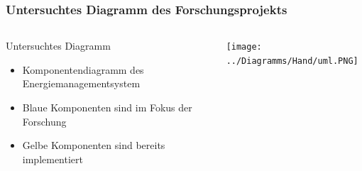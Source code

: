\documentclass[xcolor=dvipsnames]{beamer}
\begin{document}
\begin{frame}
\begin{thebibliography}{00}
		\end{thebibliography}
	\end{frame}
	
	
	
	
	
	\begin{frame}
		\frametitle{Untersuchtes Diagramm des Forschungsprojekts}
		\begin{columns}
			
			
			\begin{column}{0.35\textwidth}
				\begin{block}{Untersuchtes Diagramm}
					\begin{itemize}
						\item Komponentendiagramm des Energiemanagementsystem
						\item Blaue Komponenten sind im Fokus der Forschung
						\item Gelbe Komponenten sind bereits implementiert
					\end{itemize}
					
				\end{block}
			\end{column}
	
			\begin{column}{0.7\textwidth}
				\begin{minipage}{\textwidth}
					\texttt{[image: ../Diagramms/Hand/uml.PNG]}
				\end{minipage}
			\end{column}
			
				\end{columns}
	\end{frame}
	
	
	
\end{document}
